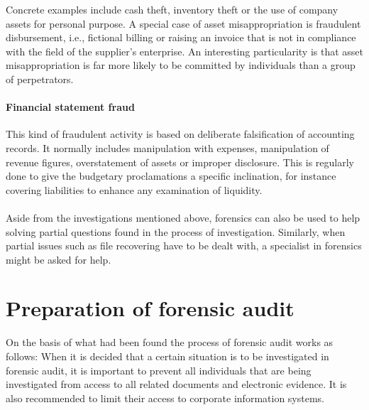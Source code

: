 Concrete examples include cash theft, inventory theft or the use of company assets for personal purpose. A special case of asset misappropriation is fraudulent disbursement, i.e., fictional billing or raising an invoice that is not in compliance with the field of the supplier's enterprise. An interesting particularity is that asset misappropriation is far more likely to be committed by individuals than a group of perpetrators\cite{whitepaper}.


\paragraph {Financial statement fraud}
This kind of fraudulent activity is based on deliberate falsification of accounting records. It normally includes manipulation with expenses, manipulation of revenue figures, overstatement of assets or improper disclosure. This is regularly done to give the budgetary proclamations a specific inclination, for instance covering liabilities to enhance any examination of liquidity.


\paragraph{} Aside from the investigations mentioned above, forensics can also be used to help solving partial questions found in the process of investigation. Similarly, when partial issues such as file recovering have to be dealt with, a specialist in forensics might be asked for help.




\section{Preparation of forensic audit}

On the basis of what had been found the process of forensic audit works as follows: \newline When it is decided that a certain situation is to be investigated in forensic audit, it is important to prevent all individuals that are being investigated from access to all related documents and electronic evidence. It is also recommended to limit their access to corporate information systems. 

